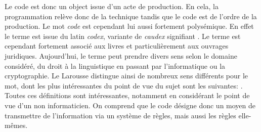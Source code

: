 \documentclass[12pt]{article} %
\begin{document}
Le code est donc un object issue d'un acte de production. En cela, la programmation relève donc de la technique tandis que le code est de l'ordre de la production. Le mot \textit{code} est cependant lui aussi fortement polysémique. En effet le terme est issue du latin \textit{codex}, variante de \textit{caudex} signifiant . Le terme est cependant fortement associé aux livres et particulièrement aux ouvrages juridiques. Aujourd'hui, le terme peut prendre divers sens selon le domaine considéré, du droit à la linguistique en passant par l'informatique ou la cryptographie. Le Larousse distingue ainsi de nombreux sens différents pour le mot, dont les plus intéressantes du point de vue du sujet sont les suivantes:
\cite{Nimmo2017-ya}. Toutes ces définitions sont intéressantes, notamment en considérant le point de vue d'un non informaticien. On comprend que le code désigne donc un moyen de transmettre de l'information via un système de règles, mais aussi les règles elle-mêmes. 
\end{document}
